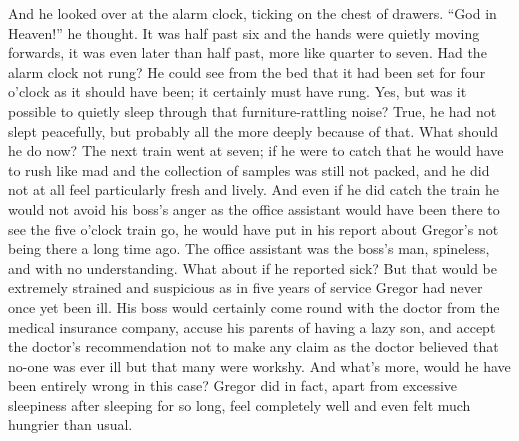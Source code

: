 And he looked over at the alarm clock, ticking on the chest of drawers.
“God in Heaven!” he thought. It was half past six and the hands were
quietly moving forwards, it was even later than half past, more like
quarter to seven. Had the alarm clock not rung? He could see from the
bed that it had been set for four o’clock as it should have been; it
certainly must have rung. Yes, but was it possible to quietly sleep
through that furniture-rattling noise? True, he had not slept
peacefully, but probably all the more deeply because of that. What
should he do now? The next train went at seven; if he were to catch
that he would have to rush like mad and the collection of samples was
still not packed, and he did not at all feel particularly fresh and
lively. And even if he did catch the train he would not avoid his
boss’s anger as the office assistant would have been there to see the
five o’clock train go, he would have put in his report about Gregor’s
not being there a long time ago. The office assistant was the boss’s
man, spineless, and with no understanding. What about if he reported
sick? But that would be extremely strained and suspicious as in five
years of service Gregor had never once yet been ill. His boss would
certainly come round with the doctor from the medical insurance
company, accuse his parents of having a lazy son, and accept the
doctor’s recommendation not to make any claim as the doctor believed
that no-one was ever ill but that many were workshy. And what’s more,
would he have been entirely wrong in this case? Gregor did in fact,
apart from excessive sleepiness after sleeping for so long, feel
completely well and even felt much hungrier than usual.

